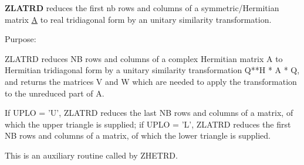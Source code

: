 {\bfseries Z\+L\+A\+T\+R\+D} reduces the first nb rows and columns of a symmetric/\+Hermitian matrix \hyperlink{classA}{A} to real tridiagonal form by an unitary similarity transformation. 

 \begin{DoxyParagraph}{Purpose\+: }
\begin{DoxyVerb} ZLATRD reduces NB rows and columns of a complex Hermitian matrix A to
 Hermitian tridiagonal form by a unitary similarity
 transformation Q**H * A * Q, and returns the matrices V and W which are
 needed to apply the transformation to the unreduced part of A.

 If UPLO = 'U', ZLATRD reduces the last NB rows and columns of a
 matrix, of which the upper triangle is supplied;
 if UPLO = 'L', ZLATRD reduces the first NB rows and columns of a
 matrix, of which the lower triangle is supplied.

 This is an auxiliary routine called by ZHETRD.\end{DoxyVerb}
 
\end{DoxyParagraph}

